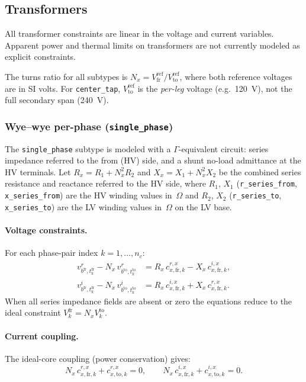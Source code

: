 \documentclass[11pt,a4paper]{article}
\newcommand{\vr}[2]{v^r_{#1,#2}}
\newcommand{\vi}[2]{v^i_{#1,#2}}
\begin{document}
\subsection{Transformers}

All transformer constraints are linear in the voltage and current variables.
Apparent power and thermal limits on transformers are not currently modeled
as explicit constraints.

The turns ratio for all subtypes is
$N_x = V^\text{ref}_\text{fr} / V^\text{ref}_\text{to}$,
where both reference voltages are in SI volts.  For \texttt{center\_tap},
$V^\text{ref}_\text{to}$ is the \emph{per-leg} voltage (e.g.\ 120~V), not
the full secondary span (240~V).

\subsubsection*{Wye--wye per-phase (\texttt{single\_phase})}

The \texttt{single\_phase} subtype is modeled with a
$\Gamma$-equivalent circuit: series impedance referred to the from (HV) side,
and a shunt no-load admittance at the HV terminals.
Let $R_x = R_1 + N_x^2 R_2$ and $X_x = X_1 + N_x^2 X_2$ be the combined
series resistance and reactance referred to the HV side, where $R_1$, $X_1$
(\texttt{r\_series\_from}, \texttt{x\_series\_from}) are the HV winding
values in~$\Omega$ and $R_2$, $X_2$
(\texttt{r\_series\_to}, \texttt{x\_series\_to}) are the LV winding values
in~$\Omega$ on the LV base.

\paragraph{Voltage constraints.}
For each phase-pair index $k = 1,\ldots,n_c$:
%
\begin{align}
  \vr{b^\text{fr}}{t^\text{fr}_k} - N_x\,\vr{b^\text{to}}{t^\text{to}_k}
  &= R_x\,c^{r,x}_{x,\text{fr},k} - X_x\,c^{i,x}_{x,\text{fr},k},
  \label{eq:yy-v-r}\\
  \vi{b^\text{fr}}{t^\text{fr}_k} - N_x\,\vi{b^\text{to}}{t^\text{to}_k}
  &= R_x\,c^{i,x}_{x,\text{fr},k} + X_x\,c^{r,x}_{x,\text{fr},k}.
  \label{eq:yy-v-i}
\end{align}
%
When all series impedance fields are absent or zero the equations reduce to
the ideal constraint $V^\text{fr}_k = N_x V^\text{to}_k$.

\paragraph{Current coupling.}
The ideal-core coupling (power conservation) gives:
%
\begin{equation}
  N_x\,c^{r,x}_{x,\text{fr},k} + c^{r,x}_{x,\text{to},k} = 0,
  \qquad
  N_x\,c^{i,x}_{x,\text{fr},k} + c^{i,x}_{x,\text{to},k} = 0.
  \label{eq:yy-i}
\end{equation}
\end{document}
